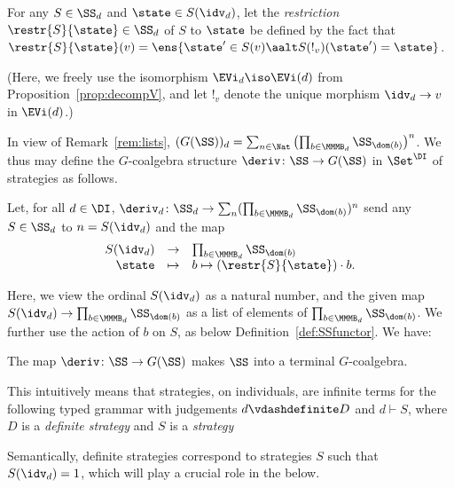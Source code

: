 \documentclass{LMCS}
\theoremstyle{plain}\newtheorem{satz}[thm]{Satz}
\begin{document}
     \begin{defi}\label{defi:restr}
       For any $S \in \SS_d$ and $\state \in S (\idv_d)$, let the
       \emph{restriction} $\restr{S}{\state} \in \SS_d$ of $S$ to
       $\state$ be defined by the fact that $\restr{S}{\state} (v) =
       \ens{\state' \in S (v) \aalt S(!_v)(\state') = \state}$.
     \end{defi}
     (Here, we freely use the isomorphism $\EVi_d \iso \EVi (d)$ from
     Proposition~\ref{prop:decompV}, and let $!_v$ denote the unique
     morphism $\idv_d \to v$ in $\EVi(d)$.)

     In view of Remark~\ref{rem:lists}, $(G(\SS))_d = \sum_{n
       \in \Nat} \left (\prod_{b \in \MMMB_d} \SS_{\dom (b)}
     \right )^n$.  We thus may define the $G$-coalgebra structure
     $\deriv \colon \SS \to G (\SS)$ in $\Set^\DI$ of
     strategies as follows.
     \begin{defi}
       Let, for all $d \in \DI$, $\deriv_d \colon \SS_d \to
       \sum_n (\prod_{b \in \MMMB_d} \SS_{\dom (b)})^n$ send any $S
       \in \SS_d$ to $n = S (\idv_d)$ and the map
       $$
       \begin{array}{rcll}
         S(\idv_d) & \to & \prod_{b \in \MMMB_d} \SS_{\dom (b)} \\
         \state & \mapsto & b \mapsto (\restr{S}{\state}) \cdot b.
       \end{array}
       $$
     \end{defi}
     Here, we view the ordinal $S (\idv_d)$ as a natural number, and
     the given map $S(\idv_d) \to \prod_{b \in \MMMB_d} \SS_{\dom
       (b)}$ as a list of elements of $\prod_{b \in \MMMB_d} \SS_{\dom
       (b)}$.  We further use the action of $b$ on $S$, as below
     Definition~\ref{def:SSfunctor}.
We have:
\begin{thm}\label{thm:stratcoalg}
  The map $\deriv \colon \SS \to G(\SS)$ makes $\SS$ into a terminal
  $G$-coalgebra.
\end{thm}
This intuitively means that strategies, on individuals, are
infinite terms for the following typed grammar with
judgements $d \vdashdefinite D$ and $d \vdash S$, where $D$ is a
\emph{definite strategy} and $S$ is a \emph{strategy}
Semantically, definite strategies correspond to strategies $S$ such
that $S (\idv_d) = 1$, which will play a crucial role in the \lts{}
below.
\end{document}
